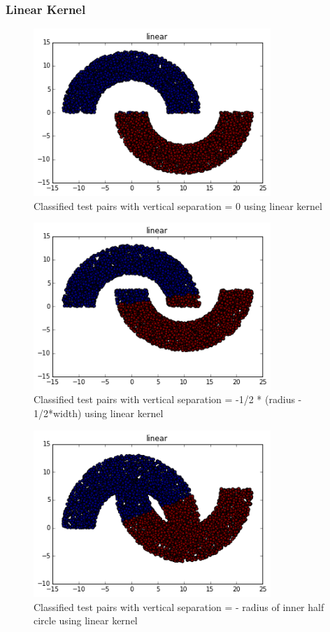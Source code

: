 \documentclass[paper=a4, fontsize=11pt]{scrartcl} %
\numberwithin{equation}{section} %
\numberwithin{figure}{section} %
\numberwithin{table}{section} %
\begin{document}
\subsubsection{Linear Kernel}
\begin{figure}[H]
	\centering
  \includegraphics[width=0.8\textwidth]{linear_1.png}
	\caption{Classified test pairs with vertical separation = 0 using linear kernel}
	\label{fig_l1}
\end{figure}
\begin{figure}[H]
	\centering
  \includegraphics[width=0.8\textwidth]{linear_2.png}
	\caption{Classified test pairs with vertical separation = -1/2 * (radius - 1/2*width) using linear kernel}
	\label{fig_l2}
\end{figure}
\begin{figure}[H]
	\centering
  \includegraphics[width=0.8\textwidth]{linear_3.png}
	\caption{Classified test pairs with vertical separation = - radius of inner half circle using linear kernel}
	\label{fig_l3}
\end{figure}
\end{document}
